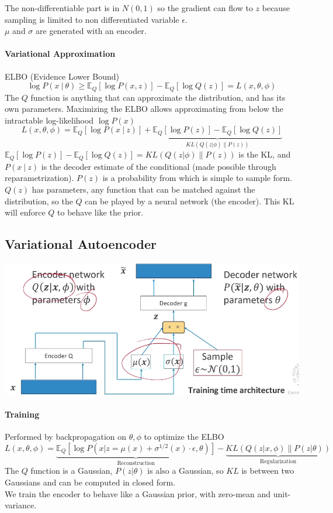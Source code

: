 \documentclass[10pt]{report}
\begin{document}
The non-differentiable part is in $N(0,1)$ so the gradient can flow to $z$ because sampling is limited to non differentiated variable $\epsilon$.\\
$\mu$ and $\sigma$ are generated with an encoder.
\paragraph{Variational Approximation} ELBO (Evidence Lower Bound)
$$\log P(x\:|\:\theta)\geq \mathbb{E}_Q[\log P(x,z)] - \mathbb{E}_Q[\log Q(z)] = L(x,\theta,\phi)$$
The $Q$ function is anything that can approximate the distribution, and has its own parameters. Maximizing the ELBO allows approximating from below the intractable log-likelihood $\log P(x)$
$$ L(x,\theta,\phi) = \mathbb{E}_Q[\log P(x\:|\:z)] + \underset{KL(Q(z|\phi)\|P(z))}{\underbrace{\mathbb{E}_Q[\log P(z)] - \mathbb{E}_Q[\log Q(z)]}}$$
$\mathbb{E}_Q[\log P(z)] - \mathbb{E}_Q[\log Q(z)] = KL(Q(z|\phi)\|P(z))$ is the KL, and $P(x\:|\:z)$ is the decoder estimate of the conditional (made possible through reparametrization). $P(z)$ is a probability from which is simple to sample form. $Q(z)$ has parameters, any function that can be matched against the distribution, so the $Q$ can be played by a neural network (the encoder). This KL will enforce $Q$ to behave like the prior.
\subsection{Variational Autoencoder}\begin{center}
	\includegraphics[scale=0.55]{144.png}
\end{center}
\paragraph{Training} Performed by backpropagation on $\theta,\phi$ to optimize the ELBO
$$L(x,\theta,\phi) = \underset{\text{Reconstruction}}{\underbrace{\mathbb{E}_Q[\log P(x|z=\mu(x)+\sigma^{1/2}(x)\cdot\epsilon,\theta)]}} - \underset{\text{Regularization}}{\underbrace{KL(Q(z|x,\phi)\|P(z|\theta))}}$$
The $Q$ function is a Gaussian, $P(z|\theta)$ is also a Gaussian, so $KL$ is between two Gaussians and can be computed in closed form.\\
We train the encoder to behave like a Gaussian prior, with zero-mean and unit-variance.
\end{document}
